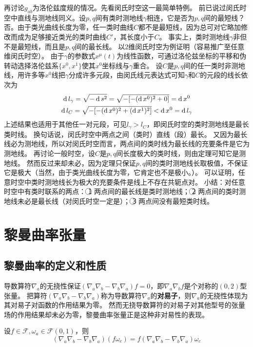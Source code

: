 再讨论$g_{ab}$为洛伦兹度规的情况。先看闵氏时空这一最简单特例。
前已说过闵氏时空中直线与测地线同义。设$p, q$间有类时测地线$\gamma$相连，它是否为$p, q$间的最短线？
否。由于类光曲线长度为零，任一类时曲线$C$都不是最短线，因为总可对它略加修改而成为足够接近类光的类时曲线$C'$，其长度小于$C$。
事实上，类时测地线$\gamma$非但不是最短线，而且是$p, q$间的最长线。
以$2$维闵氏时空为例证明（容易推广至任意维闵氏时空）。
由于$\gamma$的参数式$x^\mu(t)$为线性函数，可通过洛伦兹坐标的平移和伪转动选择洛伦兹系$\{x^0, x^1\}$使其$x^0$坐标线与$\gamma$重合。
设$C$是$p, q$间的任一类时非测地线，用许多等$x^0$线把$\gamma$分成许多元段，由闵氏线元表达式可知$\gamma$和$C$的元段的线长依次为
\begin{gather*}
\operatorname{d} l_\gamma = \sqrt{-\operatorname{d} s^2} = \sqrt{-[-(\operatorname{d} x^0)^2 + 0]} = \operatorname{d} x^0 \\
\operatorname{d} l_C = \sqrt{-[-(\operatorname{d} x^0)^2 + (\operatorname{d} x^1)^2]} < \operatorname{d} x^0 = \operatorname{d} l_\gamma
\end{gather*}
上述结果也适用于其他任一对元段，可见$l_\gamma > l_C$，即闵氏时空的类时测地线是最长类时线。
换句话说，闵氏时空中两点之间（类时）直线（段）最长。
又因为最长线必为测地线，所以对闵氏时空而言，两点间的类时线为最长线的充要条件是它为测地线。
再讨论一般时空，设$C$是$p, q$间长度极大的类时线，则由定理可知它是测地线。
然而反过来却未必，因为定理只保证$p, q$间的类时测地线长取极值，不保证它是极大（当然，由于类光曲线长度为零，它肯定也不是极小。）。
可以证明，任意时空中类时测地线长为极大的充要条件是线上不存在共轭点对。
小结：对任意时空中有类时联系的两点：
\textcircled{1} 两点间的最长线是类时测地线；
\textcircled{2} 两点间的类时测地线未必是最长线（对闵氏时空一定是）；
\textcircled{3} 两点间没有最短类时线。

\section{黎曼曲率张量}

\subsection{黎曼曲率的定义和性质}

导数算符$\nabla_a$的无挠性保证$(\nabla_a\nabla_b - \nabla_b\nabla_a)f = 0$，即$\nabla_a\nabla_bf$是个对称的$(0, 2)$型张量。
把算符$(\nabla_a\nabla_b - \nabla_b\nabla_a)$称为导数算符$\nabla_a$的\textbf{对易子}，则$\nabla_a$的无挠性体现为其对易子对函数的作用结果为零。
然而无挠导数算符的对易子对其他型号的张量场的作用结果却未必为零，黎曼曲率张量正是这种非对易性的表现。

\begin{theorem}
设$f \in \mathscr{F}, \omega_a \in \mathscr{F}(0, 1)$，则
$$(\nabla_a\nabla_b - \nabla_b\nabla_a)(f\omega_c) = f(\nabla_a\nabla_b - \nabla_b\nabla_a)\omega_c$$
\end{theorem}

